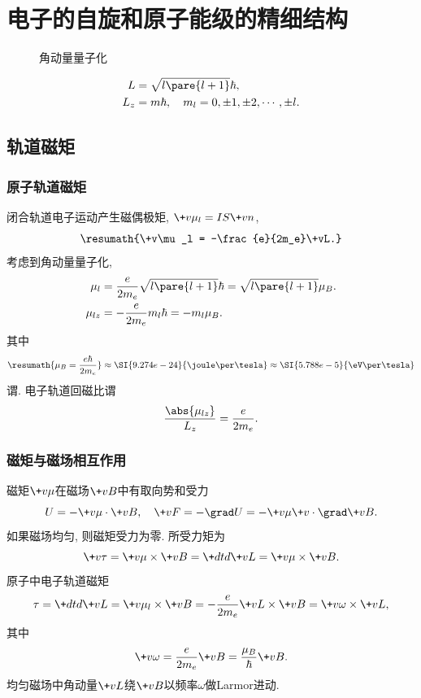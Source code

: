 \documentclass[hidelinks]{ctexart}
\begin{document}
\section{电子的自旋和原子能级的精细结构} %
\label{sec:电子的自旋和原子能级的精细结构}

\begin{figure}[ht]
    \centering
    \caption{角动量量子化}
\end{figure}
\vspace{-\baselineskip}
\begin{align*}
    L &= \sqrt{l\pare{l+1}}\hbar, \\
    L_z &= m\hbar,\quad m_l = 0,\pm 1,\pm 2,\cdots,\pm l.
\end{align*}

\subsection{轨道磁矩} %
\label{sub:轨道磁矩}

\subsubsection{原子轨道磁矩} %
\label{ssub:原子轨道磁矩}

闭合轨道电子运动产生磁偶极矩, $\+v\mu_l = IS\+vn$,
\[ \resumath{\+v\mu_l = -\frac{e}{2m_e}\+vL.} \]
考虑到角动量量子化,
\begin{align*}
    \mu_l &= \frac{e}{2m_e}\sqrt{l\pare{l+1}}\hbar = \sqrt{l\pare{l+1}}\mu_B. \\
    \mu_{lz} &= -\frac{e}{2m_e}m_l\hbar = -m_l\mu_B.\\
\end{align*}
其中
\[ \resumath{\mu_B = \frac{e\hbar}{2m_e}} \approx \SI{9.274e-24}{\joule\per\tesla} \approx \SI{5.788e-5}{\eV\per\tesla} \]
谓. 电子轨道回磁比谓
\[ \frac{\abs{\mu_{lz}}}{L_z} = \frac{e}{2m_e}. \]


\subsubsection{磁矩与磁场相互作用} %
\label{ssub:磁矩与磁场相互作用}

磁矩$\+v\mu$在磁场$\+vB$中有取向势和受力
\[ U = -\+v\mu\cdot \+vB,\quad \+vF = -\grad U = -\+v\mu\+v\cdot\grad \+vB. \]
如果磁场均匀, 则磁矩受力为零. 所受力矩为
\[ \+v\tau = \+v\mu\times \+vB = \+dtd{\+vL} = \+v\mu\times \+vB. \]
原子中电子轨道磁矩
\[ \tau = \+dtd{\+vL} = \+v\mu_l\times \+vB = -\frac{e}{2m_e}\+vL\times \+vB = \+v\omega \times \+vL, \]
其中
\[ \+v\omega = \frac{e}{2m_e}\+vB = \frac{\mu_B}{\hbar}\+vB. \]
均匀磁场中角动量$\+vL$绕$\+vB$以频率$\omega$做Larmor进动.
\end{document}
